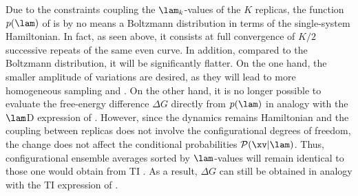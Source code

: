 

Due to the constraints coupling the $\lam_k$-values of the
$K$ replicas, the function $p(\lam)$ of 
is by no means a Boltzmann distribution in terms of the single-system
Hamiltonian. In fact, as seen above, it consists at full convergence
of $K/2$ successive repeats of the same even
curve.
In addition, compared to the Boltzmann distribution,
it will be
significantly flatter. On the one hand, the smaller amplitude of variations 
are desired, as they will lead to more homogeneous sampling 
and .
%
%
%
On the other hand, it is no longer possible to evaluate 
the free-energy difference $\Delta G$
directly from $p(\lam)$ in analogy with the $\lam$D expression of .
%
However, since the dynamics remains Hamiltonian and the coupling 
between replicas does not
involve the configurational degrees of freedom, the change  does not affect 
the conditional probabilities $\mathcal{P}(\xv | \lam)$. Thus,
configurational ensemble averages sorted by $\lam$-values will remain
identical to those one would obtain from TI .
%
As a result, $\Delta G$ can still be obtained 
in analogy with the TI expression
of .
%



